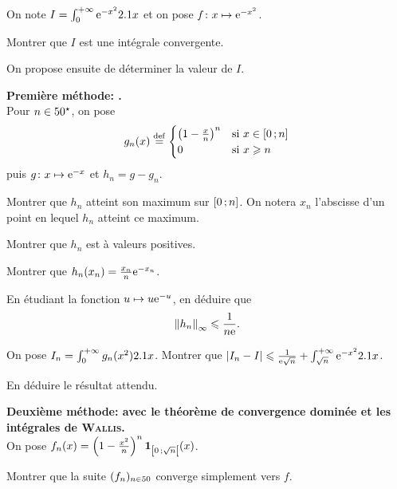 \begin{exercice}
On note $I = \int_0^{+\infty} \e^{-x^2} \d x$ et on pose $\fonctionligne[f]{x}{\e^{-x^2}}$.

\begin{questions}
\item Montrer que $I$ est une intégrale convergente.
\end{questions}
On propose ensuite de déterminer la valeur de $I$.
\begin{questions}[resume]
\item \textbf{Première méthode: .} \\ 
Pour $n \in \Ne$, on pose
$$
g_n(x) \defeq
\begin{cases}
\left(1 - \frac{x}{n} \right)^n &\text{si } x \in \interff{0}{n} \\
0 &\text{si } x \geqslant n
\end{cases}
$$
puis $\fonctionligne[g]{x}{\e^{-x}}$ et $h_n = g - g_n$.

\begin{questions}
\item Montrer que $h_n$ atteint son maximum sur $\interff{0}{n}$. On notera $x_n$ l'abscisse d'un point en lequel $h_n$ atteint ce maximum.

\item Montrer que $h_n$ est à valeurs positives.

\item Montrer que $h_n(x_n) = \frac{x_n}{n} \e^{-x_n}$.

\item En étudiant la fonction $u \mapsto u \e^{-u}$, en déduire que
\[
\norm{h_n}_\infty \leqslant \frac{1}{n \e}.
\]

\item On pose $I_n= \int_0^{+\infty} g_n(x^2) \d x$. Montrer que $\module{I_n - I} \leqslant \frac{1}{\e \sqrt{n}} + \int_{\sqrt{n}}^{+\infty} \e^{-x^2} \d x$.

\item En déduire le résultat attendu.
\end{questions}

\item \textbf{Deuxième méthode: avec le théorème de convergence dominée et les intégrales de \textsc{Wallis.}} \\
On pose $f_n(x) = \left(1 - \frac{x^2}{n}\right)^n \indicatrice{\interfo{0}{\sqrt{n}}}(x)$.
\begin{questions}
\item Montrer que la suite $(f_n)_{n\in\N}$ converge simplement vers $f$.


\end{questions}
\end{questions}
\end{exercice}
